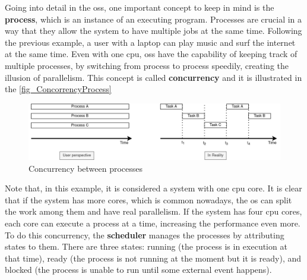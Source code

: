 

Going into detail in the \glspl{os}, one important concept to keep in mind is the \textbf{process}, which is an instance of an executing 
program. Processes are crucial in a way that they allow the system to have multiple jobs at the same time. Following the previous example, a 
user with a laptop can play music and surf the internet at the same time. Even with one \gls{cpu}, \glspl{os} have the capability of keeping 
track of multiple processes, by switching from process to process speedily, creating the illusion of parallelism. This concept is called 
\textbf{concurrency} and it is illustrated in the \autoref{fig_ConcorrencyProcess}

\begin{figure}[H]
	\centering
 	\includegraphics[width=1\linewidth]{Images/ConcorrencyProcess.png}
 	\caption{ Concurrency between processes }
	 \label{fig_ConcorrencyProcess}
\end{figure}

Note that, in this example, it is considered a system with one \gls{cpu} core. It is clear that if the system has more cores, which is common 
nowadays, the \gls{os} can split the work among them and have real parallelism. If the system has four \gls{cpu} cores, each core can execute a 
process at a time, increasing the performance even more. To do this concurrency, the \textbf{scheduler} manages the 
processes by attributing states to them. There are three states: running (the process is in execution at that time), ready (the process is not 
running at the moment but it is ready), and blocked (the process is unable to run until some external event happens). 


